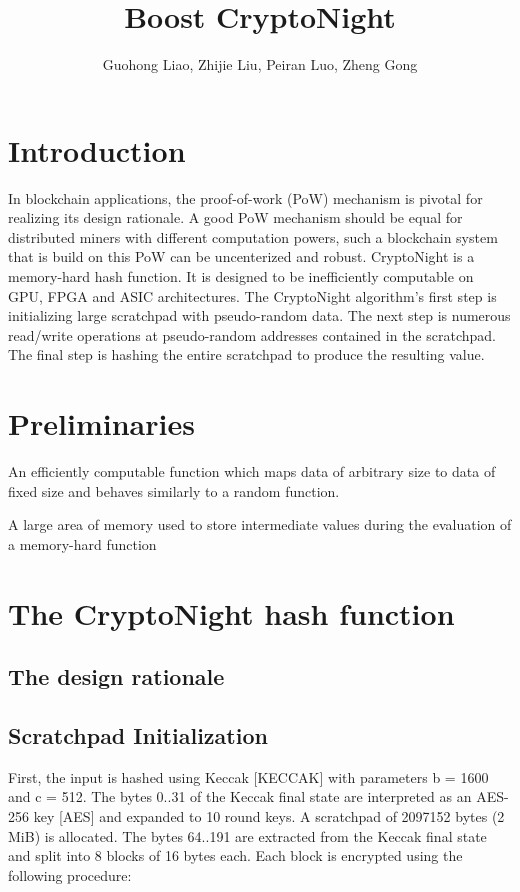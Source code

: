 \documentclass{article}
\title{Boost CryptoNight}
\author{Guohong Liao, Zhijie Liu, Peiran Luo, Zheng Gong}
\date{}
\begin{document}
\maketitle

\section{Introduction}
In blockchain applications, the proof-of-work (PoW) mechanism is pivotal for realizing its design rationale. A good PoW mechanism should be equal for distributed miners with different computation powers, such a blockchain system that is build on this PoW can be uncenterized and robust. CryptoNight is a memory-hard hash function. It is designed to be inefficiently computable on GPU, FPGA and ASIC architectures. The CryptoNight algorithm's first step is initializing large scratchpad with pseudo-random data. The next step is numerous read/write operations at pseudo-random addresses contained in the scratchpad. The final step is hashing the entire scratchpad to produce the resulting value.

\section{Preliminaries}
 An efficiently computable function which maps data of
   arbitrary size to data of fixed size and behaves similarly to a
   random function.

 A large area of memory used to store intermediate values
   during the evaluation of a memory-hard function

\section{The CryptoNight hash function}
\subsection{The design rationale}

\subsection{Scratchpad Initialization}
First, the input is hashed using Keccak [KECCAK] with parameters b =
   1600 and c = 512. The bytes 0..31 of the Keccak final state are
   interpreted as an AES-256 key [AES] and expanded to 10 round keys. A
   scratchpad of 2097152 bytes (2 MiB) is allocated. The bytes 64..191
   are extracted from the Keccak final state and split into 8 blocks of
   16 bytes each. Each block is encrypted using the following procedure:
\end{document}
